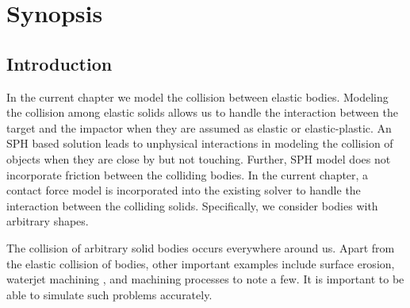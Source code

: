 \chapter{Synopsis}
\label{chap:synopsis}



\section{Introduction}
\label{sec:intro}
In the current chapter we model the collision between elastic bodies. Modeling
the collision among elastic solids allows us to handle the interaction between
the target and the impactor when they are assumed as elastic or elastic-plastic.
An SPH based solution leads to unphysical interactions in modeling the collision
of objects when they are close by but not touching. Further, SPH model does not
incorporate friction between the colliding bodies. In the current chapter, a
contact force model is incorporated into the existing solver to handle the
interaction between the colliding solids. Specifically, we consider bodies with
arbitrary shapes.


The collision of arbitrary solid bodies occurs everywhere around us. Apart
from the elastic collision of bodies, other important examples include surface
erosion, waterjet machining \citep{natarajan2020abrasive}, and machining
processes \citep{islam2020numerical} to note a few. It is important to be able
to simulate such problems accurately.


